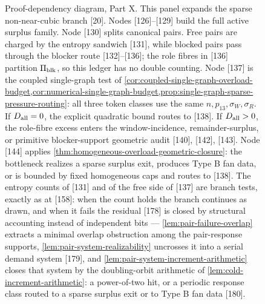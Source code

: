 \documentclass[11pt]{article}
\begin{document}
\begin{figure}[p]
{%
}
\caption[Proof-dependency diagram, Part X]{Proof-dependency diagram, Part X.  This panel expands the sparse non-near-cubic branch [20].  Nodes [126]--[129] build the full active surplus family.  Node [130] splits canonical pairs.  Free pairs are charged by the entropy sandwich [131], while blocked pairs pass through the blocker route [132]--[136]; the role fibres in [136] partition \(\Pi_{\rm blk}\), so this ledger has no double counting.  Node [137] is the coupled single-graph test of \cref{cor:coupled-single-graph-overload-budget,cor:numerical-single-graph-budget,prop:single-graph-sparse-pressure-routing}: all three token classes use the same \(n,p_{13},\sigma_W,\sigma_R\).  If \(D_{\rm all}=0\), the explicit quadratic bound routes to [138].  If \(D_{\rm all}>0\), the role-fibre excess enters the window-incidence, remainder-surplus, or primitive blocker-support geometric audit [140], [142], [143].  Node [144] applies \cref{thm:homogeneous-overload-geometric-closure}: the bottleneck realizes a sparse surplus exit, produces Type B fan data, or is bounded by fixed homogeneous caps and routes to [138].  The entropy counts of [131] and of the free side of [137] are branch tests, exactly as at [158]: when the count holds the branch continues as drawn, and when it fails the residual [178] is closed by structural accounting instead of independent bits — \cref{lem:pair-failure-overlap} extracts a minimal overlap obstruction among the pair-response supports, \cref{lem:pair-system-realizability} uncrosses it into a serial demand system [179], and \cref{lem:pair-system-increment-arithmetic} closes that system by the doubling-orbit arithmetic of \cref{lem:cold-increment-arithmetic}: a power-of-two hit, or a periodic response class routed to a sparse surplus exit or to Type B fan data [180].}

\end{figure}
\end{document}
